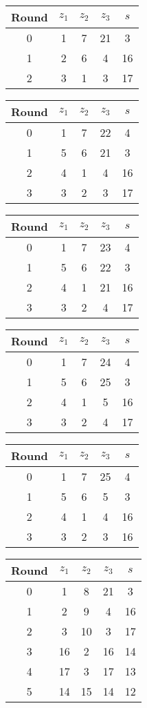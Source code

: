 \begin{tabular}{c | c | c | c | c }
Round & $z_1$ & $z_2$ & $z_3$ & $s$ \\
\hline
0 & 1 & 7 & 21 & 3 \\
1 & 2 & 6 & 4 & 16 \\
2 & 3 & 1 & 3 & 17
\end{tabular}

\begin{tabular}{c | c | c | c | c }
Round & $z_1$ & $z_2$ & $z_3$ & $s$ \\
\hline
0 & 1 & 7 & 22 & 4 \\
1 & 5 & 6 & 21 & 3 \\
2 & 4 & 1 & 4 & 16 \\
3 & 3 & 2 & 3 & 17
\end{tabular}

\begin{tabular}{c | c | c | c | c }
Round & $z_1$ & $z_2$ & $z_3$ & $s$ \\
\hline
0 & 1 & 7 & 23 & 4 \\
1 & 5 & 6 & 22 & 3 \\
2 & 4 & 1 & 21 & 16 \\
3 & 3 & 2 & 4 & 17
\end{tabular}

\begin{tabular}{c | c | c | c | c }
Round & $z_1$ & $z_2$ & $z_3$ & $s$ \\
\hline
0 & 1 & 7 & 24 & 4 \\
1 & 5 & 6 & 25 & 3 \\
2 & 4 & 1 & 5 & 16 \\
3 & 3 & 2 & 4 & 17
\end{tabular}

\begin{tabular}{c | c | c | c | c }
Round & $z_1$ & $z_2$ & $z_3$ & $s$ \\
\hline
0 & 1 & 7 & 25 & 4 \\
1 & 5 & 6 & 5 & 3 \\
2 & 4 & 1 & 4 & 16 \\
3 & 3 & 2 & 3 & 16
\end{tabular}

\begin{tabular}{c | c | c | c | c }
Round & $z_1$ & $z_2$ & $z_3$ & $s$ \\
\hline
0 & 1 & 8 & 21 & 3 \\
1 & 2 & 9 & 4 & 16 \\
2 & 3 & 10 & 3 & 17 \\
3 & 16 & 2 & 16 & 14 \\
4 & 17 & 3 & 17 & 13 \\
5 & 14 & 15 & 14 & 12
\end{tabular}

